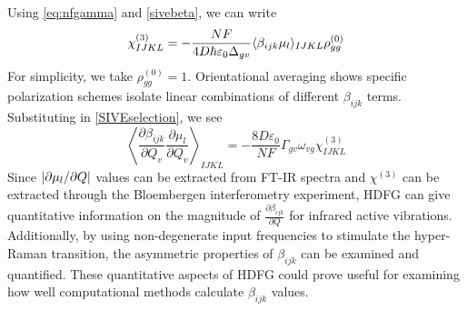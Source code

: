 \documentclass[aip, jcp, reprint, onecolumn, nofootinbib]{revtex4-2}
\begin{document}
Using \autoref{eq:nfgamma} and \autoref{sivebeta}, we can write
\begin{equation}\label{chi3}
		\chi^{(3)}_{IJKL} = -\frac{NF}{4D \hbar \varepsilon_0 \Delta_{gv}} \langle \beta_{ijk} \mu_l \rangle_{IJKL} \rho^{(0)}_{gg}\\
\end{equation}
For simplicity, we take $\rho^{(0)}_{gg} = 1$.
Orientational averaging shows specific polarization schemes isolate linear combinations of different $\beta_{ijk}$ terms. \cite{Bersohn1966, Kauranen1996}
Substituting in \autoref{SIVEselection}, we see
\begin{equation}\label{betasive}
	\left\langle \frac{\partial \beta_{ijk}}{\partial Q_v} {\frac{\partial \mu_l}{\partial Q_v}} \right\rangle_{IJKL} = -\frac{8D \varepsilon_0}{NF}  {\Gamma_{gv} \omega_{vg}} \chi^{(3)}_{IJKL}
\end{equation}
Since $\abs{\partial \mu_l / \partial Q}$ values can be extracted from FT-IR spectra and $\chi^{(3)}$ can be extracted through the Bloembergen interferometry experiment,\cite{Levenson1974_1, Levenson1974_2, RN459} HDFG can give quantitative information on the magnitude of $\frac{\partial \beta_{ijk}}{\partial Q}$ for infrared active vibrations.
Additionally, by using non-degenerate input frequencies to stimulate the hyper-Raman transition, the asymmetric properties of $\beta_{ijk}$ can be examined and quantified. \cite{Denisov1986, Kozich2007}
These quantitative aspects of HDFG could prove useful for examining how well computational methods calculate $\beta_{ijk}$ values.
\end{document}
